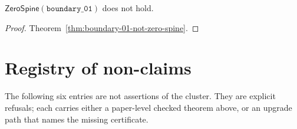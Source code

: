 \begin{theorem}
\label{thm:cannot-claim-boundary-01-in-zerospine}
\(\mathsf{ZeroSpine}(\mathtt{boundary\_01})\) does not hold.
\end{theorem}
\begin{proof}
Theorem~\ref{thm:boundary-01-not-zero-spine}.
\end{proof}

\section{Registry of non-claims}

The following six entries are not assertions of the cluster. They are explicit refusals; each carries either a paper-level checked theorem above, or an upgrade path that names the missing certificate.

